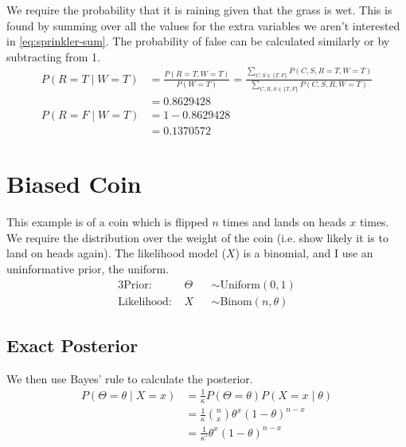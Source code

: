 We require the probability that it is raining given that the grass is wet. This is found by summing over all the values for the extra variables we aren't interested in \eqref{eq:sprinkler-sum}. The probability of false can be calculated similarly or by subtracting from 1.
\begin{align}	
	P(R=T\mid W=T) & = \frac{P(R=T,W=T)}{P(W=T)}=\frac{\sum _{C,S\in \{T,F\}}P(C,S,R=T,W=T)}{\sum_{C,R,S\in \{T,F\}}P(C,S,R,W=T)} \label{eq:sprinkler-sum}           \\
	               & = 0.8629428                                                                                                                           \nonumber \\
	P(R=F\mid W=T) & = 1 - 0.8629428                                                                                                                       \nonumber \\                                                                                                                          
	               & = 0.1370572                                                                                                                           \nonumber 
\end{align}	



\section{Biased Coin} \label{app:coin}
This example is of a coin which is flipped $n$ times and lands on heads $x$ times. We require the distribution over the weight of the coin (i.e. show likely it is to land on heads again). The likelihood model ($X$) is a binomial, and I use an uninformative prior, the uniform.
% 
\begin{alignat*}{3}
	\text{Prior:~}      & \Theta &   & \sim \text{Uniform}(0,1)    \\
	\text{Likelihood:~} & X      &   & \sim \text{Binom}(n,\theta) 
\end{alignat*}
%
\subsection{Exact Posterior} 
We then use Bayes' rule to calculate the posterior.
\begin{align*}
	P(\Theta=\theta \mid X=x) & = \frac{1}{\kappa}P(\Theta=\theta)P(X=x\mid\theta)     \\ 
	                          & = \frac{1}{\kappa}\binom{n}{x}\theta^x(1-\theta)^{n-x} \\
	                          & = \frac{1}{\kappa'}\theta^x(1-\theta)^{n-x}            
\end{align*}

